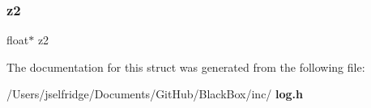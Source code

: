 \mbox{\label{structlog__id__struct_ad75e8ec27eca2db6a134f95a70d0a963}} 
\subsubsection{z2}
{\footnotesize\ttfamily float$\ast$ z2}



The documentation for this struct was generated from the following file\+:\begin{DoxyCompactItemize}
\item 
/\+Users/jselfridge/\+Documents/\+Git\+Hub/\+Black\+Box/inc/\textbf{ log.\+h}\end{DoxyCompactItemize}
